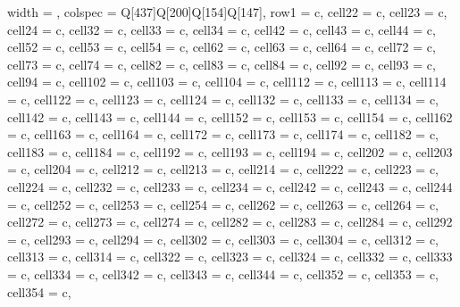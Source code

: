 {
\small
\begin{longtblr}[
    caption = {Metadata of the satellite images used in the study.},
    label = {tab:metadata_satellite_images},
    ]{
    width = \linewidth,
    colspec = {Q[437]Q[200]Q[154]Q[147]},
    row{1} = {c},
    cell{2}{2} = {c},
    cell{2}{3} = {c},
    cell{2}{4} = {c},
    cell{3}{2} = {c},
    cell{3}{3} = {c},
    cell{3}{4} = {c},
    cell{4}{2} = {c},
    cell{4}{3} = {c},
    cell{4}{4} = {c},
    cell{5}{2} = {c},
    cell{5}{3} = {c},
    cell{5}{4} = {c},
    cell{6}{2} = {c},
    cell{6}{3} = {c},
    cell{6}{4} = {c},
    cell{7}{2} = {c},
    cell{7}{3} = {c},
    cell{7}{4} = {c},
    cell{8}{2} = {c},
    cell{8}{3} = {c},
    cell{8}{4} = {c},
    cell{9}{2} = {c},
    cell{9}{3} = {c},
    cell{9}{4} = {c},
    cell{10}{2} = {c},
    cell{10}{3} = {c},
    cell{10}{4} = {c},
    cell{11}{2} = {c},
    cell{11}{3} = {c},
    cell{11}{4} = {c},
    cell{12}{2} = {c},
    cell{12}{3} = {c},
    cell{12}{4} = {c},
    cell{13}{2} = {c},
    cell{13}{3} = {c},
    cell{13}{4} = {c},
    cell{14}{2} = {c},
    cell{14}{3} = {c},
    cell{14}{4} = {c},
    cell{15}{2} = {c},
    cell{15}{3} = {c},
    cell{15}{4} = {c},
    cell{16}{2} = {c},
    cell{16}{3} = {c},
    cell{16}{4} = {c},
    cell{17}{2} = {c},
    cell{17}{3} = {c},
    cell{17}{4} = {c},
    cell{18}{2} = {c},
    cell{18}{3} = {c},
    cell{18}{4} = {c},
    cell{19}{2} = {c},
    cell{19}{3} = {c},
    cell{19}{4} = {c},
    cell{20}{2} = {c},
    cell{20}{3} = {c},
    cell{20}{4} = {c},
    cell{21}{2} = {c},
    cell{21}{3} = {c},
    cell{21}{4} = {c},
    cell{22}{2} = {c},
    cell{22}{3} = {c},
    cell{22}{4} = {c},
    cell{23}{2} = {c},
    cell{23}{3} = {c},
    cell{23}{4} = {c},
    cell{24}{2} = {c},
    cell{24}{3} = {c},
    cell{24}{4} = {c},
    cell{25}{2} = {c},
    cell{25}{3} = {c},
    cell{25}{4} = {c},
    cell{26}{2} = {c},
    cell{26}{3} = {c},
    cell{26}{4} = {c},
    cell{27}{2} = {c},
    cell{27}{3} = {c},
    cell{27}{4} = {c},
    cell{28}{2} = {c},
    cell{28}{3} = {c},
    cell{28}{4} = {c},
    cell{29}{2} = {c},
    cell{29}{3} = {c},
    cell{29}{4} = {c},
    cell{30}{2} = {c},
    cell{30}{3} = {c},
    cell{30}{4} = {c},
    cell{31}{2} = {c},
    cell{31}{3} = {c},
    cell{31}{4} = {c},
    cell{32}{2} = {c},
    cell{32}{3} = {c},
    cell{32}{4} = {c},
    cell{33}{2} = {c},
    cell{33}{3} = {c},
    cell{33}{4} = {c},
    cell{34}{2} = {c},
    cell{34}{3} = {c},
    cell{34}{4} = {c},
    cell{35}{2} = {c},
    cell{35}{3} = {c},
    cell{35}{4} = {c},
}
\end{longtblr}}
